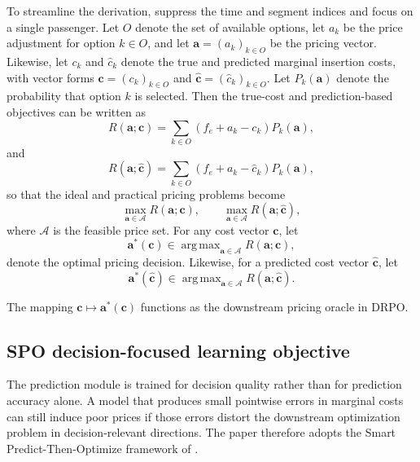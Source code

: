\documentclass[preprint,12pt,authoryear]{elsarticle}
\DeclareMathOperator*{\argmax}{arg\,max}
\begin{document}
To streamline the derivation, suppress the time and segment indices and focus on a single passenger. Let $O$ denote the set of available options, let $a_k$ be the price adjustment for option $k\in O$, and let $\mathbf{a}=(a_k)_{k\in O}$ be the pricing vector. Likewise, let $c_k$ and $\hat{c}_k$ denote the true and predicted marginal insertion costs, with vector forms $\mathbf{c}=(c_k)_{k\in O}$ and $\hat{\mathbf{c}}=(\hat{c}_k)_{k\in O}$. Let $P_k(\mathbf{a})$ denote the probability that option $k$ is selected. Then the true-cost and prediction-based objectives can be written as
\begin{equation}
R(\mathbf{a};\mathbf{c}) = \sum_{k\in O} (f_e+a_k-c_k)P_k(\mathbf{a}),
\tag{16}\label{eq:rtrue}
\end{equation}
and
\begin{equation}
R(\mathbf{a};\hat{\mathbf{c}}) = \sum_{k\in O} (f_e+a_k-\hat{c}_k)P_k(\mathbf{a}),
\tag{17}\label{eq:rhat}
\end{equation}
so that the ideal and practical pricing problems become
\begin{equation}
\max_{\mathbf{a}\in\mathcal{A}} R(\mathbf{a};\mathbf{c}),
\qquad
\max_{\mathbf{a}\in\mathcal{A}} R(\mathbf{a};\hat{\mathbf{c}}),
\tag{18}\label{eq:pricing-general}
\end{equation}
where $\mathcal{A}$ is the feasible price set. For any cost vector $\mathbf{c}$, let
\begin{equation}
\mathbf{a}^{*}(\mathbf{c}) \in \argmax_{\mathbf{a}\in\mathcal{A}} R(\mathbf{a};\mathbf{c}),
\tag{19}\label{eq:oracle}
\end{equation}
denote the optimal pricing decision. Likewise, for a predicted cost vector $\hat{\mathbf{c}}$, let
\begin{equation}
\mathbf{a}^{*}(\hat{\mathbf{c}}) \in \argmax_{\mathbf{a}\in\mathcal{A}} R(\mathbf{a};\hat{\mathbf{c}}).
\tag{20}\label{eq:oracle-hat}
\end{equation}

The mapping $\mathbf{c}\mapsto \mathbf{a}^{*}(\mathbf{c})$ functions as the downstream pricing oracle in DRPO.

\subsection{SPO decision-focused learning objective}

The prediction module is trained for decision quality rather than for prediction accuracy alone. A model that produces small pointwise errors in marginal costs can still induce poor prices if those errors distort the downstream optimization problem in decision-relevant directions. The paper therefore adopts the Smart Predict-Then-Optimize framework of \citet{elmachtoub2022}.
\end{document}
